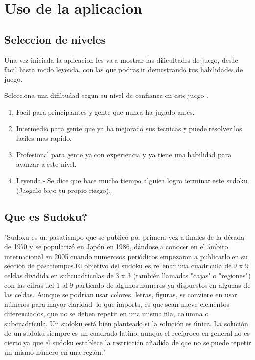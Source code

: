 \documentclass[11pt,fleqn]{book} %
\begin{document}
\chapter{Uso de la aplicacion}

\section{Seleccion de niveles}

Una vez iniciada la aplicacion les va a mostrar las dificultades de juego, desde facil hasta modo leyenda, con las que podras ir demostrando tus habilidades de juego.

Selecciona una difiltudad segun su nivel de confianza en este juego .
\begin{enumerate}
\item Facil para principiantes y gente que nunca ha jugado antes.
\item Intermedio para gente que ya ha mejorado sus tecnicas y puede resolver los faciles mas rapido.
\item Profesional para gente ya con experiencia y ya tiene una habilidad para avanzar a este nivel.
\item Leyenda.- Se dice que hace mucho tiempo alguien logro terminar este sudoku (Juegalo bajo tu propio riesgo).
\end{enumerate}



\section{Que es Sudoku?}

"Sudoku es un pasatiempo que se publicó por primera vez a finales de la década de 1970 y se popularizó en Japón en 1986, dándose a conocer en el ámbito internacional en 2005 cuando numerosos periódicos empezaron a publicarlo en su sección de pasatiempos.El objetivo del sudoku es rellenar una cuadrícula de 9 x 9 celdas dividida en subcuadriculas de 3 x 3 (también llamadas "cajas" o "regiones") con las cifras del 1 al 9 partiendo de algunos números ya dispuestos en algunas de las celdas.  Aunque se podrían usar colores, letras, figuras, se conviene en usar números para mayor claridad, lo que importa, es que sean nueve elementos diferenciados, que no se deben repetir en una misma fila, columna o subcuadrícula. Un sudoku está bien planteado si la solución es única. La solución de un sudoku siempre es un cuadrado latino, aunque el recíproco en general no es cierto ya que el sudoku establece la restricción añadida de que no se puede repetir un mismo número en una región." \cite{http://es.wikipedia.org/wiki/Sudoku}
\end{document}
